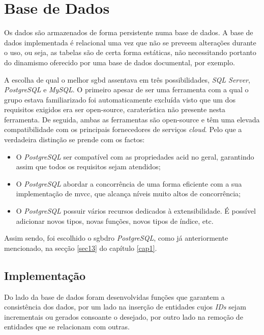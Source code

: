 \section{Base de Dados}\label{sec32}

Os dados são armazenados de forma persistente numa base de dados. A base de dados implementada é relacional uma vez que não se preveem alterações durante o uso, ou seja, as tabelas são de certa forma estáticas, não necessitando portanto do dinamismo oferecido por uma base de dados documental, por exemplo. 

 A escolha de qual o melhor \acrshort{sgbd} assentava em três possibilidades, \textit{SQL Server}, \textit{PostgreSQL} e \textit{MySQL}. O primeiro apesar de ser uma ferramenta com a qual o grupo estava familiarizado foi automaticamente excluída visto que um dos requisitos exigidos era ser \gls{open-source}, caraterística não presente nesta ferramenta. De seguida, ambas as ferramentas são \gls{open-source} e têm uma elevada compatibilidade com os principais fornecedores de serviços \textit{cloud}. Pelo que a verdadeira distinção se prende com os factos:
 	\begin{itemize}
 		\item O \textit{PostgreSQL} ser compatível com as propriedades \acrfull{acid} no geral, garantindo assim que todos os requisitos sejam atendidos;
 		\item O \textit{PostgreSQL} abordar a concorrência de uma forma eficiente com a sua implementação de \acrfull{mvcc}, que alcança níveis muito altos de concorrência;
 		\item O \textit{PostgreSQL} possuir vários recursos dedicados à extensibilidade. É possível adicionar novos tipos, novas funções, novos tipos de índice, etc.
	\end{itemize}
 Assim sendo, foi escolhido o \acrfull{sgbdro} \textit{PostgreSQL}, como já anteriormente mencionado, na secção \ref{sec13} do capítulo \ref{cap1}.
 
 \subsection{Implementação}\label{subsec321}
 
 Do lado da base de dados foram desenvolvidas funções que garantem a consistência dos dados, por um lado na inserção de entidades cujos \textit{IDs} sejam incrementais ou gerados consoante o desejado, por outro lado na remoção  de entidades que se relacionam com outras.